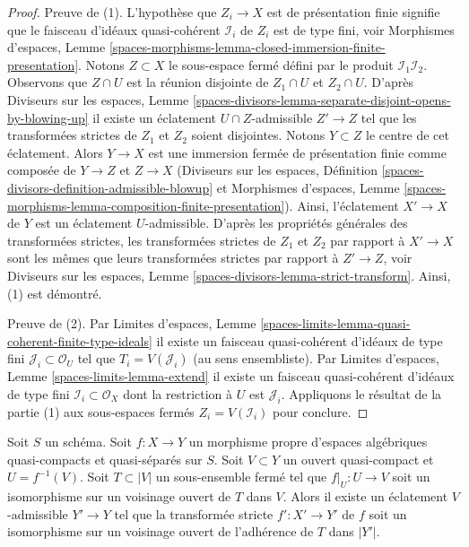 \begin{proof}
Preuve de (1). L'hypothèse que $Z_i \to X$ est de présentation finie signifie que le faisceau d'idéaux quasi-cohérent $\mathcal{I}_i$ de $Z_i$ est de type fini, voir 
Morphismes d'espaces, Lemme
\ref{spaces-morphisms-lemma-closed-immersion-finite-presentation}.
Notons $Z \subset X$ le sous-espace fermé défini par le produit $\mathcal{I}_1 \mathcal{I}_2$.
Observons que $Z \cap U$ est la réunion disjointe de $Z_1 \cap U$ et $Z_2 \cap U$. D'après Diviseurs sur les espaces, Lemme
\ref{spaces-divisors-lemma-separate-disjoint-opens-by-blowing-up}
il existe un éclatement $U \cap Z$-admissible $Z' \to Z$ tel que les transformées strictes de $Z_1$ et $Z_2$ soient disjointes.
Notons $Y \subset Z$ le centre de cet éclatement.
Alors $Y \to X$ est une immersion fermée de présentation finie comme composée de $Y \to Z$ et $Z \to X$ (Diviseurs sur les espaces, Définition
\ref{spaces-divisors-definition-admissible-blowup} et
Morphismes d'espaces, Lemme
\ref{spaces-morphisms-lemma-composition-finite-presentation}). Ainsi, l'éclatement $X' \to X$ de $Y$ est un éclatement $U$-admissible. D'après les propriétés générales des transformées strictes, les transformées strictes de $Z_1$ et $Z_2$ par rapport à $X' \to X$ sont les mêmes que leurs transformées strictes par rapport à $Z' \to Z$, voir Diviseurs sur les espaces, Lemme \ref{spaces-divisors-lemma-strict-transform}. Ainsi, (1) est démontré.

\medskip\noindent
Preuve de (2). Par Limites d'espaces, Lemme
\ref{spaces-limits-lemma-quasi-coherent-finite-type-ideals}
il existe un faisceau quasi-cohérent d'idéaux de type fini
$\mathcal{J}_i \subset \mathcal{O}_U$ tel que
$T_i = V(\mathcal{J}_i)$ (au sens ensembliste).
Par Limites d'espaces, Lemme \ref{spaces-limits-lemma-extend}
il existe un faisceau quasi-cohérent d'idéaux de type fini $\mathcal{I}_i \subset \mathcal{O}_X$
dont la restriction à $U$ est $\mathcal{J}_i$.
Appliquons le résultat de la partie (1) aux sous-espaces fermés $Z_i = V(\mathcal{I}_i)$ pour conclure.
\end{proof}

\begin{lemma}
\label{lemma-blowup-iso-along}
Soit $S$ un schéma. Soit $f : X \to Y$ un morphisme propre d'espaces algébriques quasi-compacts et quasi-séparés sur $S$. Soit $V \subset Y$ un ouvert quasi-compact et $U = f^{-1}(V)$. Soit $T \subset |V|$ un sous-ensemble fermé tel que $f|_U : U \to V$ soit un isomorphisme sur un voisinage ouvert de $T$ dans $V$. Alors il existe un éclatement $V$-admissible $Y' \to Y$ tel que la transformée stricte $f' : X' \to Y'$ de $f$ soit un isomorphisme sur un voisinage ouvert de l'adhérence de $T$ dans $|Y'|$.
\end{lemma}

